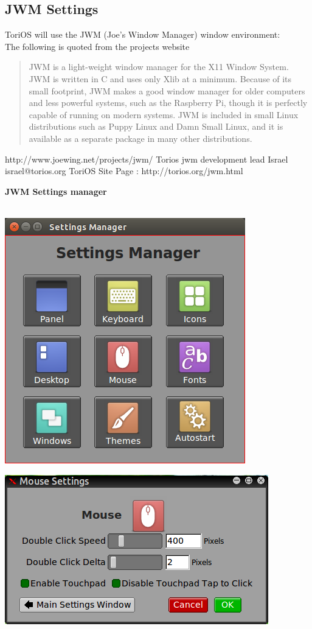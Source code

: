 \documentclass[12pt,a4paper]{book}
\begin{document}
\subsection{JWM Settings}
ToriOS will use the JWM (Joe's Window Manager) window environment:\\

The following is quoted from the projects website

\begin{quote}
JWM is a light-weight window manager for the X11 Window System. JWM is written in C and uses only Xlib at a minimum. Because of its small footprint, JWM makes a good window manager for older computers and less powerful systems, such as the Raspberry Pi, though it is perfectly capable of running on modern systems. JWM is included in small Linux distributions such as Puppy Linux and Damn Small Linux, and it is available as a separate package in many other distributions. 
\end{quote}
http://www.joewing.net/projects/jwm/
Torios jwm development lead Israel israel@torios.org
ToriOS Site Page : http://torios.org/jwm.html
\newpage

{\large \textbf{JWM Settings manager}} \\ \\


\begin{center}
\includegraphics[width=0.7\linewidth]{jwmsettingsmanager}
\end{center}

\begin{center}
\includegraphics[width=0.7\linewidth]{mouse-settings}
\end{center}
\end{document}
